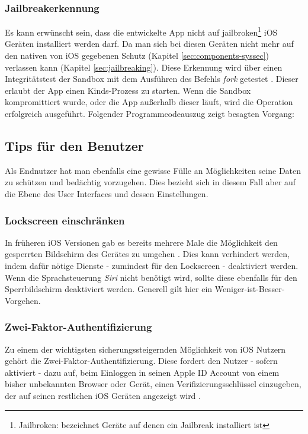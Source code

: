 		\subsubsection{Jailbreakerkennung}
			Es kann erwünscht sein, dass die entwickelte App nicht auf
			jailbroken\footnote{Jailbroken: bezeichnet Geräte auf denen ein Jailbreak
			installiert ist} iOS Geräten installiert werden darf.
			Da man sich bei diesen Geräten nicht mehr auf den nativen von iOS gegebenen Schutz (Kapitel
			\ref{sec:components-syssec}) verlassen kann (Kapitel \ref{sec:jailbreaking}).
			Diese Erkennung wird über einen Integritätstest der Sandbox mit dem
			Ausführen des Befehls \textsl{fork} getestet \cite[S.328]{Zdziarski2012}.
			Dieser erlaubt der App einen Kinds-Prozess zu starten. Wenn die Sandbox
			kompromittiert wurde, oder die App außerhalb dieser läuft, wird die
			Operation erfolgreich ausgeführt. Folgender Programmcodeauszug zeigt
			besagten Vorgang:
			
			
	\subsection{Tips für den Benutzer}
		Als Endnutzer hat man ebenfalls eine gewisse Fülle an Möglichkeiten seine
		Daten zu schützen und bedächtig vorzugehen. Dies bezieht sich in diesem Fall
		aber auf die Ebene des User Interfaces und dessen Einstellungen.
		\subsubsection{Lockscreen einschränken}
			In früheren iOS Versionen gab es bereits mehrere Male die Möglichkeit den
			gesperrten Bildschirm des Gerätes zu umgehen
			\cite{IOS7LockscreenBypass2013}.
			Dies kann verhindert werden, indem dafür nötige Dienste - zumindest für den
			Lockscreen - deaktiviert werden. Wenn die Sprachsteuerung \textsl{Siri} nicht benötigt
			wird, sollte diese ebenfalls für den Sperrbildschirm deaktiviert werden.
			Generell gilt hier ein Weniger-ist-Besser-Vorgehen.
		\subsubsection{Zwei-Faktor-Authentifizierung}
			Zu einem der wichtigsten sicherungssteigernden Möglichkeit von iOS Nutzern
			gehört die Zwei-Faktor-Authentifizierung. Diese fordert den Nutzer - sofern
			aktiviert - dazu auf, beim Einloggen in seinen Apple ID Account von einem
			bisher unbekannten Browser oder Gerät, einen Verifizierungsschlüssel
			einzugeben, der auf seinen restlichen iOS Geräten angezeigt
			wird \cite{AppleiOS9Preview2015}.
